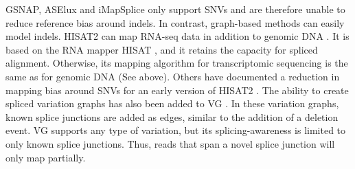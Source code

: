GSNAP, ASElux and iMapSplice only support SNVs and are therefore unable to reduce reference bias around indels.
In contrast, graph-based methods can easily model indels.
HISAT2 can map RNA-seq data in addition to genomic DNA \cite{Kim_2019}.
It is based on the RNA mapper HISAT \cite{Kim_2015}, and it retains the capacity for spliced alignment.
Otherwise, its mapping algorithm for transcriptomic sequencing is the same as for genomic DNA (See above).
Others have documented a reduction in mapping bias around SNVs for an early version of HISAT2 \cite{Liu_2018}. 
The ability to create spliced variation graphs has also been added to VG \cite{Garrison_2018}. 
In these variation graphs, known splice junctions are added as edges, similar to the addition of a deletion event.
VG supports any type of variation, but its splicing-awareness is limited to only known splice junctions.
Thus, reads that span a novel splice junction will only map partially.





